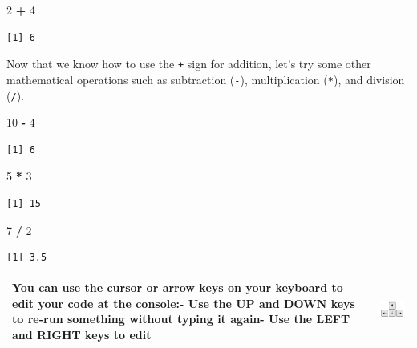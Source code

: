 \documentclass[]{article}
\newenvironment{Shaded}{\begin{snugshade}}{\end{snugshade}}
\newcommand{\DecValTok}[1]{\textcolor[rgb]{0.00,0.00,0.81}{#1}}
\newcommand{\OperatorTok}[1]{\textcolor[rgb]{0.81,0.36,0.00}{\textbf{#1}}}
\newcommand{\StringTok}[1]{\textcolor[rgb]{0.31,0.60,0.02}{#1}}
\begin{document}
\begin{Shaded}
\begin{Highlighting}[]
\DecValTok{2} \OperatorTok{+}\StringTok{ }\DecValTok{4}
\end{Highlighting}
\end{Shaded}

\begin{verbatim}
[1] 6
\end{verbatim}

Now that we know how to use the \texttt{+} sign for addition, let's try some other mathematical operations such as subtraction (\texttt{-}), multiplication (\texttt{*}), and division (\texttt{/}).

\begin{Shaded}
\begin{Highlighting}[]
\DecValTok{10} \OperatorTok{-}\StringTok{ }\DecValTok{4}
\end{Highlighting}
\end{Shaded}

\begin{verbatim}
[1] 6
\end{verbatim}

\begin{Shaded}
\begin{Highlighting}[]
\DecValTok{5} \OperatorTok{*}\StringTok{ }\DecValTok{3}
\end{Highlighting}
\end{Shaded}

\begin{verbatim}
[1] 15
\end{verbatim}

\begin{Shaded}
\begin{Highlighting}[]
\DecValTok{7} \OperatorTok{/}\StringTok{ }\DecValTok{2}
\end{Highlighting}
\end{Shaded}

\begin{verbatim}
[1] 3.5
\end{verbatim}

\begin{longtable}[]{@{}ll@{}}
\toprule
\endhead
\begin{minipage}[t]{0.69\columnwidth}\raggedright
You can use the cursor or arrow keys on your keyboard to edit your code at the console:- Use the UP and DOWN keys to re-run something without typing it again- Use the LEFT and RIGHT keys to edit\strut
\end{minipage} & \begin{minipage}[t]{0.25\columnwidth}\raggedright
\includegraphics{./img/rstudio_cursorkeys.png}\strut
\end{minipage}\tabularnewline
\bottomrule
\end{longtable}
\end{document}
